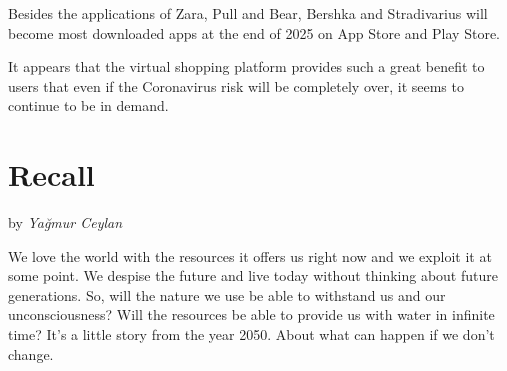 \documentclass[]{book}
\begin{document}
Besides the applications of Zara, Pull and Bear, Bershka and Stradivarius will become most downloaded apps at the end of 2025 on App Store and Play Store.

It appears that the virtual shopping platform provides such a great benefit to users that even if the Coronavirus risk will be completely over, it seems to continue to be in demand.

\hypertarget{recall}{%
\chapter{Recall}\label{recall}}

by \emph{Yağmur Ceylan}

We love the world with the resources it offers us right now and we exploit it at some point. We despise the future and live today without thinking about future generations. So, will the nature we use be able to withstand us and our unconsciousness? Will the resources be able to provide us with water in infinite time? It's a little story from the year 2050. About what can happen if we don't change.
\end{document}
